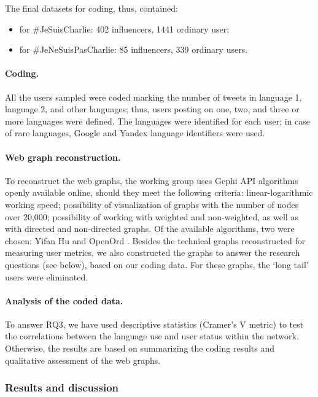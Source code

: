 The final datasets for coding, thus, contained:
\begin{itemize}
	\item for \#JeSuisCharlie: 402 influencers, 1441 ordinary user;
	\item for \#JeNeSuisPasCharlie: 85 influencers, 339 ordinary users.
\end{itemize}

\paragraph{Coding.} All the users sampled were coded marking the number of tweets in language 1, language 2, and other languages; thus, users posting on one, two, and three or more languages were defined. The languages were identified for each user; in case of rare languages, Google and Yandex language identifiers were used.

\paragraph{Web graph reconstruction.} To reconstruct the web graphs, the working group uses Gephi API algorithms openly available online, should they meet the following criteria: linear-logarithmic working speed; possibility of visualization of graphs with the number of nodes over 20,000; possibility of working with weighted and non-weighted, as well as with directed and non-directed graphs. Of the available algorithms, two were chosen: Yifan Hu \cite{Hu} and OpenOrd \cite{MartinBrownKlavans}. Besides the technical graphs reconstructed for measuring user metrics, we also constructed the graphs to answer the research questions (see below), based on our coding data. For these graphs, the ‘long tail’ users were eliminated.

\paragraph{Analysis of the coded data.} To answer RQ3, we have used descriptive statistics
(Cramer’s V metric) to test the correlations between the language use and user status within the network. Otherwise, the results are based on summarizing the coding results and qualitative assessment of the web graphs.

\subsubsection{Results and discussion}

